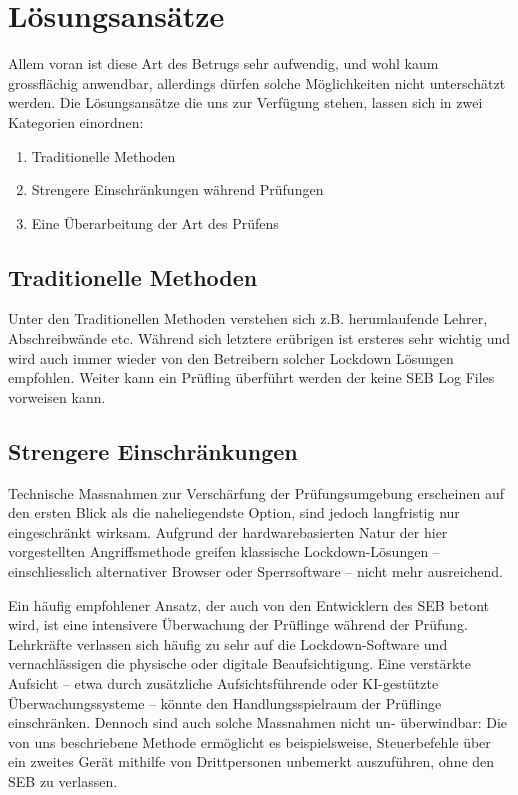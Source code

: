 \documentclass[14pt]{article}
\begin{document}
\newpage
\section{Lösungsansätze}

Allem voran ist diese Art des Betrugs sehr aufwendig, und wohl kaum grossflächig anwendbar, allerdings dürfen solche Möglichkeiten nicht unterschätzt werden. Die Lösungsansätze die uns zur Verfügung stehen, lassen sich in zwei Kategorien einordnen: 

\begin{enumerate}
\item Traditionelle Methoden
\item Strengere Einschränkungen während Prüfungen
\item Eine Überarbeitung der Art des Prüfens
\end{enumerate}

\subsection{Traditionelle Methoden}
Unter den Traditionellen Methoden verstehen sich z.B. herumlaufende Lehrer, Abschreibwände etc. Während sich letztere erübrigen ist ersteres sehr wichtig und wird auch immer wieder von den Betreibern solcher Lockdown Lösungen empfohlen. Weiter kann ein Prüfling überführt werden der keine SEB Log Files vorweisen kann.


\subsection{Strengere Einschränkungen}

Technische Massnahmen zur Verschärfung der Prüfungsumgebung erscheinen auf den ersten Blick als die naheliegendste Option, sind jedoch langfristig nur eingeschränkt wirksam. Aufgrund der hardwarebasierten Natur der hier vorgestellten Angriffsmethode greifen klassische Lockdown-Lösungen – einschliesslich alternativer Browser oder Sperrsoftware – nicht mehr ausreichend.

Ein häufig empfohlener Ansatz, der auch von den Entwicklern des SEB betont wird, ist eine intensivere Überwachung der Prüflinge während der Prüfung. Lehrkräfte verlassen sich häufig zu sehr auf die Lockdown-Software und vernachlässigen die physische oder digitale Beaufsichtigung. Eine verstärkte Aufsicht – etwa durch zusätzliche Aufsichtsführende oder KI-gestützte Überwachungssysteme – könnte den Handlungsspielraum der Prüflinge einschränken. Dennoch sind auch solche Massnahmen nicht un- überwindbar: Die von uns beschriebene Methode ermöglicht es beispielsweise, Steuerbefehle über ein zweites Gerät mithilfe von Drittpersonen unbemerkt auszuführen, ohne den SEB zu verlassen.
\end{document}
